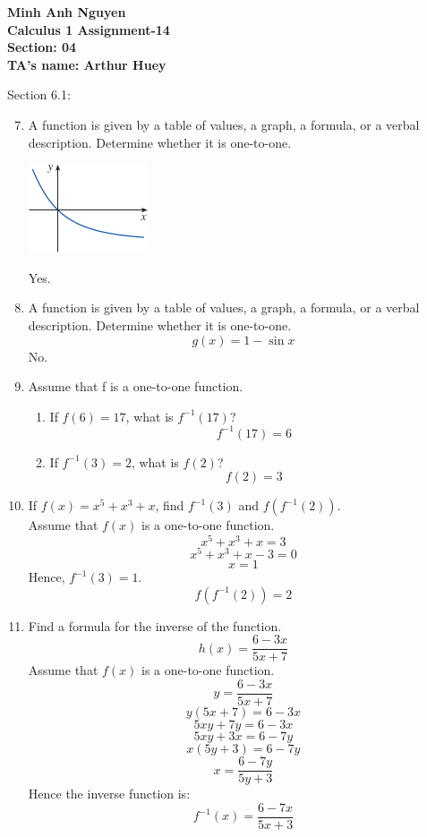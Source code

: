 \documentclass[12pt]{article}
\begin{document}
\textbf{Minh Anh Nguyen }\\
\textbf{Calculus 1 Assignment-14}\\
\textbf{Section: 04}\\
\textbf{TA's name: Arthur Huey}

\hrulefill

Section 6.1:

\begin{enumerate}
\setcounter{enumi}{6}
    \item A function is given by a table of values, a graph, a formula, or a verbal description. Determine whether it is one-to-one.
    \begin{center}
        \includegraphics{img/img-0.png}
    \end{center}
    Yes.

\setcounter{enumi}{12}
    \item A function is given by a table of values, a graph, a formula, or a verbal description. Determine whether it is one-to-one.
    \[g(x) = 1 - \sin x\]
    No.

\setcounter{enumi}{16}
    \item Assume that f is a one-to-one function.
    \begin{enumerate}
        \item If $f(6) = 17$, what is $f^{-1}(17)$?
        \[f^{-1}(17) = 6\]
        \item If $f^{-1}(3) = 2$, what is $f(2)$?
        \[f(2) = 3\]
    \end{enumerate}
    \item If $f(x) = x^5 + x^3 + x$, find $f^{-1}(3)$ and $f(f^{-1}(2))$.\\
    Assume that $f(x)$ is a one-to-one function.
    \[x^5 + x^3 + x = 3\]
    \[x^5 + x^3 + x - 3 = 0\]
    \[x = 1\]
    Hence, $f^{-1}(3) = 1$.
    \[f(f^{-1}(2)) = 2\]

\setcounter{enumi}{23}
    \item Find a formula for the inverse of the function.
    \[h(x) = \frac{6-3x}{5x+7}\]
    Assume that $f(x)$ is a one-to-one function.
    \[y = \frac{6-3x}{5x+7}\]
    \[y(5x+7) = 6-3x\]
    \[5xy + 7y = 6 - 3x\]
    \[5xy + 3x = 6 - 7y\]
    \[x(5y+3) = 6 - 7y\]
    \[x = \frac{6-7y}{5y+3}\]
    Hence the inverse function is:
    \[f^{-1}(x) = \frac{6-7x}{5x+3}\]


\end{enumerate}
\end{document}
